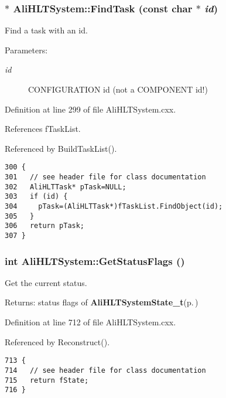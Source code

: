 \subsubsection{ $\ast$ Ali\-HLTSystem::Find\-Task (const char $\ast$ {\em id})}\label{classAliHLTSystem_a11}


Find a task with an id. \begin{Desc}
\item[Parameters:]
\begin{description}
\item[{\em id}]CONFIGURATION id (not a COMPONENT id!) \end{description}
\end{Desc}


Definition at line 299 of file Ali\-HLTSystem.cxx.

References f\-Task\-List.

Referenced by Build\-Task\-List().

\footnotesize\begin{verbatim}300 {
301   // see header file for class documentation
302   AliHLTTask* pTask=NULL;
303   if (id) {
304     pTask=(AliHLTTask*)fTaskList.FindObject(id); 
305   }
306   return pTask;
307 }
\end{verbatim}\normalsize 


\subsubsection{\setlength{\rightskip}{0pt plus 5cm}int Ali\-HLTSystem::Get\-Status\-Flags ()}\label{classAliHLTSystem_a29}


Get the current status. \begin{Desc}
\item[Returns:]status flags of {\bf Ali\-HLTSystem\-State\_\-t}{\rm (p.\,\pageref{classAliHLTSystem_w7})} \end{Desc}


Definition at line 712 of file Ali\-HLTSystem.cxx.

Referenced by Reconstruct().

\footnotesize\begin{verbatim}713 {
714   // see header file for class documentation
715   return fState;
716 }
\end{verbatim}\normalsize 


